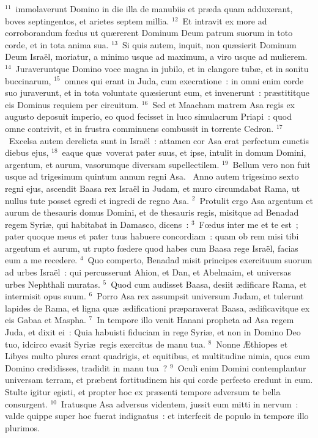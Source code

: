 ${}^{11}$~immolaverunt Domino in die illa de manubiis et pr\ae da quam adduxerant, boves septingentos, et arietes septem millia.
${}^{12}$~Et intravit ex more ad corroborandum fœdus ut qu\ae rerent Dominum Deum patrum suorum in toto corde, et in tota anima sua.
${}^{13}$~Si quis autem, inquit, non qu\ae sierit Dominum Deum Isra\"el, moriatur, a minimo usque ad maximum, a viro usque ad mulierem.
${}^{14}$~Juraveruntque Domino voce magna in jubilo, et in clangore tub\ae , et in sonitu buccinarum,
${}^{15}$~omnes qui erant in Juda, cum execratione~: in omni enim corde suo juraverunt, et in tota voluntate qu\ae sierunt eum, et invenerunt~: pr\ae stititque eis Dominus requiem per circuitum.
${}^{16}$~Sed et Maacham matrem Asa regis ex augusto deposuit imperio, eo quod fecisset in luco simulacrum Priapi~: quod omne contrivit, et in frustra comminuens combussit in torrente Cedron.
${}^{17}$~Excelsa autem derelicta sunt in Isra\"el~: attamen cor Asa erat perfectum cunctis diebus ejus,
${}^{18}$~eaque qu\ae\ voverat pater suus, et ipse, intulit in domum Domini, argentum, et aurum, vasorumque diversam supellectilem.
${}^{19}$~Bellum vero non fuit usque ad trigesimum quintum annum regni Asa.
~\lettrine[lines=10,image=true,loversize=0.05,lraise=-0.03]{A}{}nno autem trigesimo sexto regni ejus, ascendit Baasa rex Isra\"el in Judam, et muro circumdabat Rama, ut nullus tute posset egredi et ingredi de regno Asa.
${}^{2}$~Protulit ergo Asa argentum et aurum de thesauris domus Domini, et de thesauris regis, misitque ad Benadad regem Syri\ae , qui habitabat in Damasco, dicens~:
${}^{3}$~Fœdus inter me et te est~; pater quoque meus et pater tuus habuere concordiam~: quam ob rem misi tibi argentum et aurum, ut rupto fœdere quod habes cum Baasa rege Isra\"el, facias eum a me recedere.
${}^{4}$~Quo comperto, Benadad misit principes exercituum suorum ad urbes Isra\"el~: qui percusserunt Ahion, et Dan, et Abelmaim, et universas urbes Nephthali muratas.
${}^{5}$~Quod cum audisset Baasa, desiit \ae dificare Rama, et intermisit opus suum.
${}^{6}$~Porro Asa rex assumpsit universum Judam, et tulerunt lapides de Rama, et ligna qu\ae\ \ae dificationi pr\ae paraverat Baasa, \ae dificavitque ex eis Gabaa et Maspha.
${}^{7}$~In tempore illo venit Hanani propheta ad Asa regem Juda, et dixit ei~: Quia habuisti fiduciam in rege Syri\ae , et non in Domino Deo tuo, idcirco evasit Syri\ae\ regis exercitus de manu tua.
${}^{8}$~Nonne \AE thiopes et Libyes multo plures erant quadrigis, et equitibus, et multitudine nimia, quos cum Domino credidisses, tradidit in manu tua~?
${}^{9}$~Oculi enim Domini contemplantur universam terram, et pr\ae bent fortitudinem his qui corde perfecto credunt in eum. Stulte igitur egisti, et propter hoc ex pr\ae senti tempore adversum te bella consurgent.
${}^{10}$~Iratusque Asa adversus videntem, jussit eum mitti in nervum~: valde quippe super hoc fuerat indignatus~: et interfecit de populo in tempore illo plurimos.


